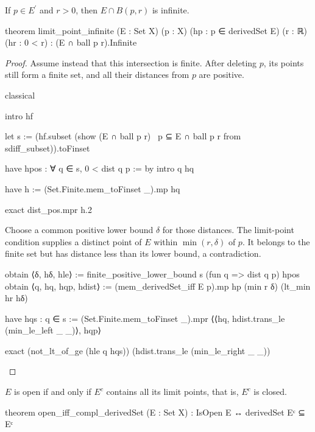 \begin{proposition}
  \label{ma:thm:limit-point-neighborhood-contains-infinite-elements}
  If $p\in E^{\prime}$ and $r>0$, then $E\cap B(p,r)$ is infinite.

  \begin{lean}
    theorem limit_point_infinite (E : Set X) (p : X)
        (hp : p ∈ derivedSet E) (r : ℝ) (hr : 0 < r) :
        (E ∩ ball p r).Infinite
  \end{lean}
\end{proposition}

\begin{proof}
  Assume instead that this intersection is finite.
  After deleting $p$, its points still form a finite set, and all their distances from $p$ are
  positive.

  \begin{lean}
    classical

    intro hf

    let s := (hf.subset (show (E ∩ ball p r) \ {p} ⊆ E ∩ ball p r from sdiff_subset)).toFinset

    have hpos : ∀ q ∈ s, 0 < dist q p := by
      intro q hq

      have h := (Set.Finite.mem_toFinset _).mp hq

      exact dist_pos.mpr h.2
  \end{lean}

  Choose a common positive lower bound $\delta$ for those distances.
  The limit-point condition supplies a distinct point of $E$ within $\min(r,\delta)$ of $p$.
  It belongs to the finite set but has distance less than its lower bound, a contradiction.

  \begin{lean}
    obtain ⟨δ, hδ, hle⟩ := finite_positive_lower_bound s (fun q => dist q p) hpos
    obtain ⟨q, hq, hqp, hdist⟩ := (mem_derivedSet_iff E p).mp hp (min r δ) (lt_min hr hδ)

    have hqs : q ∈ s := (Set.Finite.mem_toFinset _).mpr
      ⟨⟨hq, hdist.trans_le (min_le_left _ _)⟩, hqp⟩

    exact (not_lt_of_ge (hle q hqs)) (hdist.trans_le (min_le_right _ _))
  \end{lean}

\end{proof}

\begin{proposition}
  \label{ma:thm:complement-of-open-set-is-closed}
  $E$ is open if and only if $E^{c}$ contains all its limit points, that is, $E^{c}$ is closed.

  \begin{lean}
    theorem open_iff_compl_derivedSet (E : Set X) :
        IsOpen E ↔ derivedSet Eᶜ ⊆ Eᶜ
  \end{lean}
\end{proposition}


